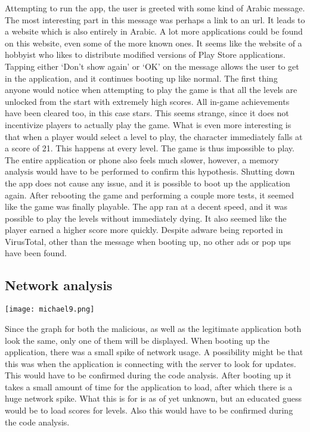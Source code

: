 Attempting to run the app, the user is greeted with some kind of Arabic message. The most interesting part in this message was perhaps a link to an url. It leads to a website which is also entirely in Arabic. A lot more applications could be found on this website, even some of the more known ones. It seems like the website of a hobbyist who likes to distribute modified versions of Play Store applications. Tapping either ‘Don’t show again’ or ‘OK’ on the message allows the user to get in the application, and it continues booting up like normal.
The first thing anyone would notice when attempting to play the game is that all the levels are unlocked from the start with extremely high scores. All in-game achievements have been cleared too, in this case stars. This seems strange, since it does not incentivize players to actually play the game. What is even more interesting is that when a player would select a level to play, the character immediately falls at a score of 21. This happens at every level. The game is thus impossible to play. The entire application or phone also feels much slower, however, a memory analysis would have to be performed to confirm this hypothesis. Shutting down the app does not cause any issue, and it is possible to boot up the application again. After rebooting the game and performing a couple more tests, it seemed like the game was finally playable. The app ran at a decent speed, and it was possible to play the levels without immediately dying. It also seemed like the player earned a higher score more quickly. Despite adware being reported in VirusTotal, other than the message when booting up, no other ads or pop ups have been found.
\newpage
\subsection{Network analysis}

\texttt{[image: michael9.png]}

Since the graph for both the malicious, as well as the legitimate application both look the same, only one of them will be displayed. When booting up the application, there was a small spike of network usage. A possibility might be that this was when the application is connecting with the server to look for updates. This would have to be confirmed during the code analysis.
After booting up it takes a small amount of time for the application to load, after which there is a huge network spike. What this is for is as of yet unknown, but an educated guess would be to load scores for levels. Also this would have to be confirmed during the code analysis.
